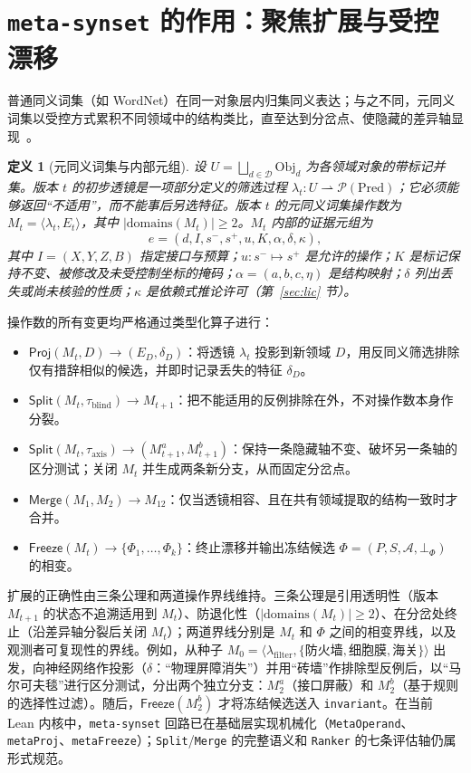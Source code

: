 \documentclass[11pt,a4paper,UTF8,fontset=fandol]{ctexart}
\newtheorem{definition}[theorem]{定义}
\DeclareRobustCommand{\id}[1]{\nolinkurl{#1}}
\begin{document}
\section{\texorpdfstring{\id{meta-synset}}{meta-synset} 的作用：聚焦扩展与受控漂移}
普通同义词集（如 WordNet）在同一对象层内归集同义表达；与之不同，元同义词集以受控方式累积不同领域中的结构类比，直至达到分岔点、使隐藏的差异轴显现~\cite{ms2}。

\begin{definition}[元同义词集与内部元组]
设 $U=\bigsqcup_{d\in\mathcal D}\mathrm{Obj}_d$ 为各领域对象的带标记并集。版本 $t$ 的初步透镜是一项部分定义的筛选过程 $\lambda_t:U\rightharpoonup\mathcal P(\mathrm{Pred})$；它必须能够返回“不适用”，而不能事后另选特征。版本 $t$ 的元同义词集操作数为 $M_t=\langle\lambda_t,E_t\rangle$，其中 $|\mathrm{domains}(M_t)|\ge2$。$M_t$ 内部的证据元组为
\begin{equation}
e=(d,I,s^-,s^+,u,K,\alpha,\delta,\kappa),
\end{equation}
其中 $I=(X,Y,Z,B)$ 指定接口与预算；$u:s^-\mapsto s^+$ 是允许的操作；$K$ 是标记保持不变、被修改及未受控制坐标的掩码；$\alpha=(a,b,c,\eta)$ 是结构映射；$\delta$ 列出丢失或尚未核验的性质；$\kappa$ 是依赖式推论许可（第~\ref{sec:lic} 节）。
\end{definition}

操作数的所有变更均严格通过类型化算子进行：
\begin{itemize}
\item $\mathsf{Proj}(M_t,D)\to(E_D,\delta_D)$：将透镜 $\lambda_t$ 投影到新领域 $D$，用反同义筛选排除仅有措辞相似的候选，并即时记录丢失的特征 $\delta_D$。
\item $\mathsf{Split}(M_t,\tau_{\mathrm{blind}})\to M_{t+1}$：把不能适用的反例排除在外，不对操作数本身作分裂。
\item $\mathsf{Split}(M_t,\tau_{\mathrm{axis}})\to(M_{t+1}^a,M_{t+1}^b)$：保持一条隐藏轴不变、破坏另一条轴的区分测试；关闭 $M_t$ 并生成两条新分支，从而固定分岔点。
\item $\mathsf{Merge}(M_1,M_2)\to M_{12}$：仅当透镜相容、且在共有领域提取的结构一致时才合并。
\item $\mathsf{Freeze}(M_t)\to\{\Phi_1,\ldots,\Phi_k\}$：终止漂移并输出冻结候选 $\Phi=(P,S,\mathcal A,\bot_\Phi)$ 的相变。
\end{itemize}
扩展的正确性由三条公理和两道操作界线维持。三条公理是引用透明性（版本 $M_{t+1}$ 的状态不追溯适用到 $M_t$）、防退化性（$|\mathrm{domains}(M_t)|\ge2$）、在分岔处终止（沿差异轴分裂后关闭 $M_t$）；两道界线分别是 $M_t$ 和 $\Phi$ 之间的相变界线，以及观测者可复现性的界线。例如，从种子 $M_0=\langle\lambda_{\mathrm{filter}},\{\text{防火墙},\text{细胞膜},\text{海关}\}\rangle$ 出发，向神经网络作投影（$\delta$：“物理屏障消失”）并用“砖墙”作排除型反例后，以“马尔可夫毯”进行区分测试，分出两个独立分支：$M_2^a$（接口屏蔽）和 $M_2^b$（基于规则的选择性过滤）。随后，$\mathsf{Freeze}(M_2^b)$ 才将冻结候选送入 \id{invariant}。在当前 Lean 内核中，\id{meta-synset} 回路已在基础层实现机械化（\id{MetaOperand}、\id{metaProj}、\id{metaFreeze}）；\id{Split}/\id{Merge} 的完整语义和 \id{Ranker} 的七条评估轴仍属形式规范。
\end{document}
